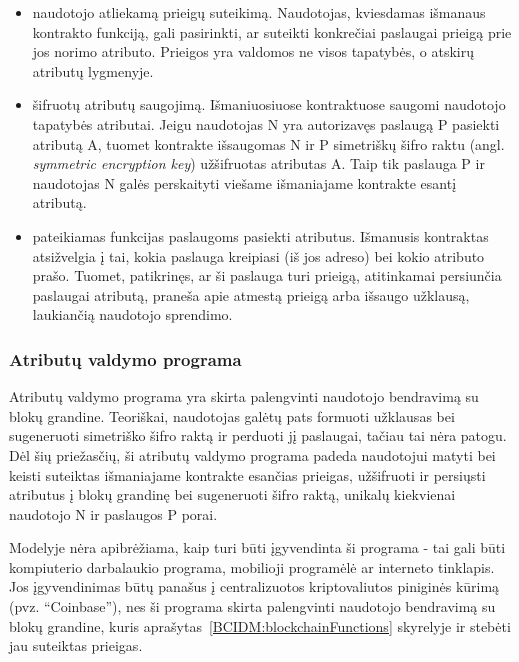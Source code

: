 \begin{itemize}
    \item naudotojo atliekamą prieigų suteikimą. Naudotojas, kviesdamas išmanaus kontrakto funkciją, gali pasirinkti,
    ar suteikti konkrečiai paslaugai prieigą prie jos norimo atributo. Prieigos yra valdomos ne visos tapatybės, o
    atskirų atributų lygmenyje.

    \item šifruotų atributų saugojimą. Išmaniuosiuose kontraktuose saugomi naudotojo tapatybės atributai. Jeigu naudotojas N
    yra autorizavęs paslaugą P pasiekti atributą A, tuomet kontrakte išsaugomas N ir P simetriškų šifro raktu (angl.
    \textit{symmetric encryption key}) užšifruotas atributas A. Taip tik paslauga P
    ir naudotojas N galės perskaityti viešame išmaniajame kontrakte esantį atributą.

    \item pateikiamas funkcijas paslaugoms pasiekti atributus. Išmanusis kontraktas atsižvelgia į tai, kokia paslauga kreipiasi (iš
    jos adreso) bei kokio atributo prašo. Tuomet, patikrinęs, ar ši paslauga turi prieigą, atitinkamai persiunčia
    paslaugai atributą, praneša apie atmestą prieigą arba išsaugo užklausą, laukiančią naudotojo sprendimo.
\end{itemize}

\subsubsection{Atributų valdymo programa}

Atributų valdymo programa yra skirta palengvinti naudotojo bendravimą su blokų grandine. Teoriškai, naudotojas galėtų pats formuoti užklausas
bei sugeneruoti simetriško šifro raktą ir perduoti jį paslaugai, tačiau tai nėra patogu. Dėl šių priežasčių, ši atributų valdymo
programa padeda naudotojui matyti bei keisti suteiktas išmaniajame kontrakte esančias prieigas, užšifruoti ir persiųsti atributus į blokų grandinę
bei sugeneruoti šifro raktą, unikalų kiekvienai naudotojo N ir paslaugos P porai.

Modelyje nėra apibrėžiama, kaip turi būti įgyvendinta ši programa - tai gali būti kompiuterio darbalaukio programa,
mobilioji programėlė ar 
interneto tinklapis. Jos įgyvendinimas būtų panašus į centralizuotos kriptovaliutos piniginės kūrimą (pvz. \enquote{Coinbase}), nes ši
programa skirta palengvinti naudotojo bendravimą su blokų grandine, kuris aprašytas\hypertarget{BCIDM:blockchainFunctions}{~\ref{BCIDM:blockchainFunctions}} skyrelyje ir
stebėti jau suteiktas prieigas.

